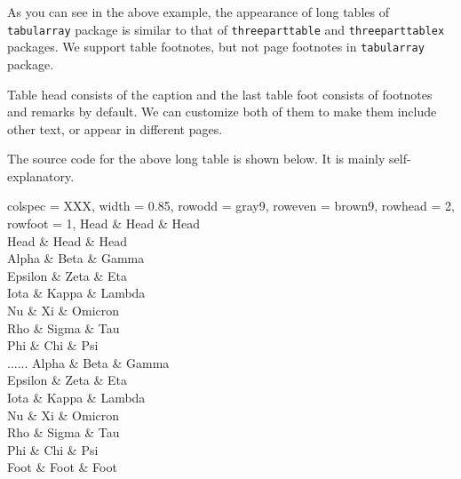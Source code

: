 \documentclass[oneside]{book}
\begin{document}
As you can see in the above example, the appearance of long tables of \verb!tabularray! package
is similar to that of \verb!threeparttable! and \verb!threeparttablex! packages.
We support table footnotes, but not page footnotes in \verb!tabularray! package.

Table head consists of the caption and the last table foot consists of footnotes and remarks by default.
We can customize both of them to make them include other text, or appear in different pages.

\newpage

The source code for the above long table is shown below. It is mainly self-explanatory.

\begin{codehigh}
\begin{longtblr}[
  theme = fancy,
  caption = {A Long Long Long Long Long Long Long Table},
  entry = {Short Caption},
  label = {tblr:test},
  note{a} = {It is the first footnote.},
  note{$\dag$} = {It is the second long long long long long long footnote.},
  remark{Note} = {Some general note. Some general note. Some general note.},
  remark{Source} = {Made up by myself. Made up by myself. Made up by myself.},
]{
  colspec = {XXX}, width = 0.85\linewidth,
  row{odd} = {gray9}, row{even} = {brown9}, rowhead = 2, rowfoot = 1,
}
\hline
  Head & Head & Head \\
\hline
  Head & Head & Head \\
\hline
 Alpha   & Beta  & Gamma   \\
\hline
 Epsilon & Zeta & Eta \\
\hline
 Iota    & Kappa\TblrNote{$\dag$} & Lambda \\
\hline
 Nu      & Xi    & Omicron \\
\hline
 Rho     & Sigma & Tau     \\
\hline
 Phi     & Chi   & Psi     \\
\hline
......
\hline
 Alpha   & Beta  & Gamma   \\
\hline
 Epsilon & Zeta  & Eta     \\
\hline
 Iota    & Kappa & Lambda  \\
\hline
 Nu      & Xi    & Omicron \\
\hline
 Rho     & Sigma & Tau     \\
\hline
 Phi     & Chi   & Psi     \\
\hline
  Foot & Foot & Foot \\
\hline
\end{longtblr}
\end{codehigh}
\end{document}
